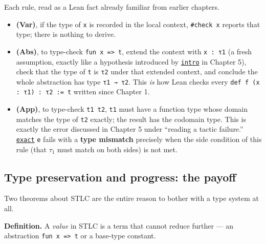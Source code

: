 Each rule, read as a Lean fact already familiar from earlier chapters.

\begin{itemize}
\tightlist
\item
  \textbf{(Var)}, if the type of \texttt{x} is recorded in the local context, \texttt{\#check x} reports that type; there is nothing to derive.
\item
  \textbf{(Abs)}, to type-check \texttt{fun x => t}, extend the context with \texttt{x : τ1} (a fresh assumption, exactly like a hypothesis introduced by \href{https://lean-lang.org/doc/reference/latest/Tactic-Proofs/Tactic-Reference/}{\texttt{intro}} in Chapter 5), check that the type of \texttt{t} is \texttt{τ2} under that extended context, and conclude the whole abstraction has type \texttt{τ1 → τ2}. This \emph{is} how Lean checks every \texttt{def f (x : τ1) : τ2 := t} written since Chapter 1.
\item
  \textbf{(App)}, to type-check \texttt{t1 t2}, \texttt{t1} must have a function type whose domain matches the type of \texttt{t2} exactly; the result has the codomain type. This is exactly the error discussed in Chapter 5 under ``reading a tactic failure.'' \href{https://lean-lang.org/doc/reference/latest/Tactic-Proofs/Tactic-Reference/}{\texttt{exact}} \texttt{e} fails with a \textbf{type mismatch} precisely when the side condition of this rule (that \(\tau_1\) must match on both sides) is not met.
\end{itemize}

\subsection{Type preservation and progress: the payoff}\label{sec:06-rigor-check:03-typing-rules-and-safety:4}

Two theorems about STLC are the entire reason to bother with a type system at all.

\textbf{Definition.} A \emph{value} in STLC is a term that cannot reduce further --- an abstraction \texttt{fun x => t} or a base-type constant.

